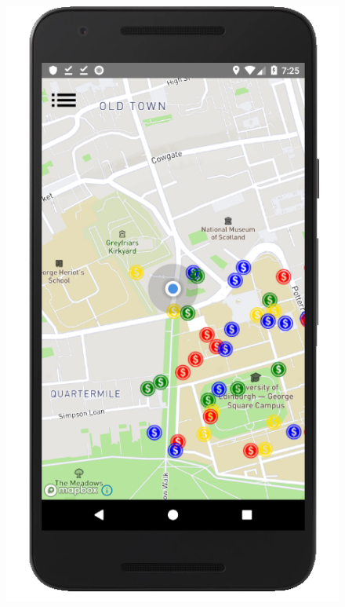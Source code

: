 \documentclass[12pt]{article}
\begin{document}
\begin{figure}
	\centering
	\includegraphics[scale=0.25]{MainActivity.png}

\end{figure}
\end{document}
